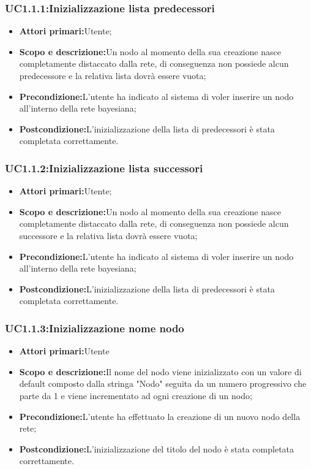 \subsubsection{UC1.1.1:Inizializzazione lista predecessori}
\begin{itemize}
	\item{\textbf{Attori primari:}Utente;}
	\item{\textbf{Scopo e descrizione:}Un nodo al momento della sua creazione nasce completamente distaccato dalla rete, di conseguenza non possiede alcun predecessore e la relativa lista dovrà essere vuota;}
	\item{\textbf{Precondizione:}L'utente ha indicato al sistema di voler inserire un nodo all'interno della rete bayesiana;}
	\item{\textbf{Postcondizione:}L'inizializzazione della lista di predecessori è stata completata correttamente.}
\end{itemize}
\subsubsection{UC1.1.2:Inizializzazione lista successori}
\begin{itemize}
	\item{\textbf{Attori primari:}Utente;}
	\item{\textbf{Scopo e descrizione:}Un nodo al momento della sua creazione nasce completamente distaccato dalla rete, di conseguenza non possiede alcun successore e la relativa lista dovrà essere vuota;}
	\item{\textbf{Precondizione:}L'utente ha indicato al sistema di voler inserire un nodo all'interno della rete bayesiana;}
	\item{\textbf{Postcondizione:}L'inizializzazione della lista di predecessori è stata completata correttamente.}
\end{itemize}
\subsubsection{UC1.1.3:Inizializzazione nome nodo}
\begin{itemize}
	\item{\textbf{Attori primari:}Utente}
	\item{\textbf{Scopo e descrizione:}Il nome del nodo viene inizializzato con un valore di default composto dalla stringa "Nodo" seguita da un numero progressivo che parte da 1 e viene incrementato ad ogni creazione di un nodo;}
	\item{\textbf{Precondizione:}L'utente ha effettuato la creazione di un nuovo nodo della rete;}
	\item{\textbf{Postcondizione:}L'inizializzazione del titolo del nodo è stata completata correttamente.}
\end{itemize}

